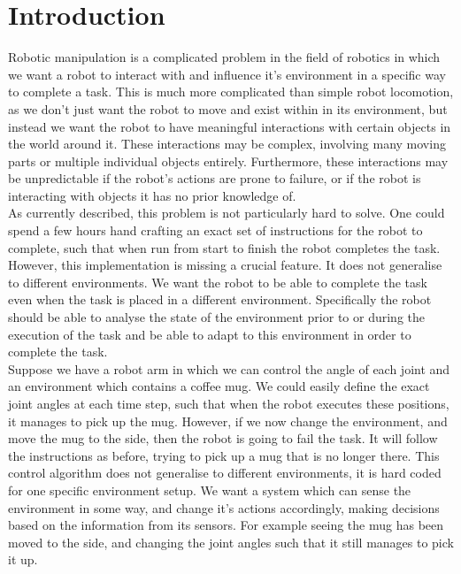 \chapter{Introduction}
\label{chap:introduction}

Robotic manipulation is a complicated problem in the field of robotics in which we want a robot to interact with and influence it's environment in a specific way to complete a task. This is much more complicated than simple robot locomotion, as we don't just want the robot to move and exist within in its environment, but instead we want the robot to have meaningful interactions with certain objects in the world around it. These interactions may be complex, involving many moving parts or multiple individual objects entirely. Furthermore, these interactions may be unpredictable if the robot's actions are prone to failure, or if the robot is interacting with objects it has no prior knowledge of.\\

As currently described, this problem is not particularly hard to solve. One could spend a few hours hand crafting an exact set of instructions for the robot to complete, such that when run from start to finish the robot completes the task. However, this implementation is missing a crucial feature. It does not generalise to different environments. We want the robot to be able to complete the task even when the task is placed in a different environment. Specifically the robot should be able to analyse the state of the environment prior to or during the execution of the task and be able to adapt to this environment in order to complete the task.\\

Suppose we have a robot arm in which we can control the angle of each joint and an environment which contains a coffee mug. We could easily define the exact joint angles at each time step, such that when the robot executes these positions, it manages to pick up the mug. However, if we now change the environment, and move the mug to the side, then the robot is going to fail the task. It will follow the instructions as before, trying to pick up a mug that is no longer there. This control algorithm does not generalise to different environments, it is hard coded for one specific environment setup. We want a system which can sense the environment in some way, and change it's actions accordingly, making decisions based on the information from its sensors. For example seeing the mug has been moved to the side, and changing the joint angles such that it still manages to pick it up.\\

